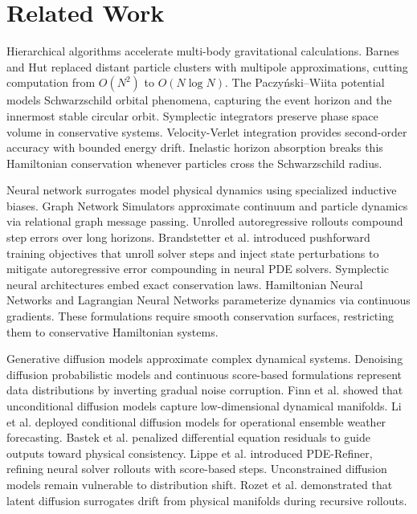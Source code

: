 \documentclass[11pt,a4paper]{article}
\begin{document}
\section{Related Work}
\label{sec:related_work}

Hierarchical algorithms accelerate multi-body gravitational calculations. Barnes and Hut \cite{Barnes1986} replaced distant particle clusters with multipole approximations, cutting computation from $O(N^2)$ to $O(N \log N)$. The Paczy\'nski--Wiita potential \cite{Paczynski1980} models Schwarzschild orbital phenomena, capturing the event horizon and the innermost stable circular orbit. Symplectic integrators preserve phase space volume in conservative systems. Velocity-Verlet integration \cite{Verlet1967} provides second-order accuracy with bounded energy drift. Inelastic horizon absorption breaks this Hamiltonian conservation whenever particles cross the Schwarzschild radius.

Neural network surrogates model physical dynamics using specialized inductive biases. Graph Network Simulators \cite{sanchez-gonzalez2020learning, battaglia2016interaction} approximate continuum and particle dynamics via relational graph message passing. Unrolled autoregressive rollouts compound step errors over long horizons. Brandstetter et al. \cite{brandstetter2022message} introduced pushforward training objectives that unroll solver steps and inject state perturbations to mitigate autoregressive error compounding in neural PDE solvers. Symplectic neural architectures embed exact conservation laws. Hamiltonian Neural Networks \cite{greydanus2019hamiltonian} and Lagrangian Neural Networks \cite{cranmer2020lagrangian} parameterize dynamics via continuous gradients. These formulations require smooth conservation surfaces, restricting them to conservative Hamiltonian systems.

Generative diffusion models approximate complex dynamical systems. Denoising diffusion probabilistic models \cite{ho2020denoising} and continuous score-based formulations \cite{song2021scorebased} represent data distributions by inverting gradual noise corruption. Finn et al. \cite{finn2024representation} showed that unconditional diffusion models capture low-dimensional dynamical manifolds. Li et al. \cite{li2024generative} deployed conditional diffusion models for operational ensemble weather forecasting. Bastek et al. \cite{bastek2024physics} penalized differential equation residuals to guide outputs toward physical consistency. Lippe et al. \cite{LippeVPTB23} introduced PDE-Refiner, refining neural solver rollouts with score-based steps. Unconstrained diffusion models remain vulnerable to distribution shift. Rozet et al. \cite{rozet2025lost} demonstrated that latent diffusion surrogates drift from physical manifolds during recursive rollouts.
\end{document}
